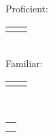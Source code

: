 {	}{ %
		
		\noindent\begin{minipage}[t]{0.275\textwidth}
			
			\sidesection{\educationhistory}	\\[0.25\baselineskip]
			\educationUW 
			\educationEvergreen
			\educationHyogo
			
			\sidesection{\courses} \\
			\sidebarcoursework
			
			
			\sidesection{\skills} \\ 
			\sidesubsection{\skillsprogramming} \\
			Proficient:\\[0.25\baselineskip]
			\begin{tabular}{l l}
				\proficientskills
			\end{tabular}\\
			Familiar: \\[0.25\baselineskip]
			\begin{tabular}{l l} 
				\familiarskills
			\end{tabular}

			
			\sidesubsection{\skillslanguage} \\
			\begin{tabular}{l}
				\skillenglish \\
				\skilljapanese
			\end{tabular} \quarterlinebreak \\
			
			
		\end{minipage}
		\hfill
		\begin{minipage}[t]{0.7\textwidth}
			\majorsection{\experience} 
				\jobexpNPD
				\jobexpGSP
				\jobexpGDIIntern	
		\majorsection{\graduatecoursework} 
		\courseworkML
		\courseworkNLM
		\courseworkNLP

		\majorsection{\projectsawards\vspace{-0.25\baselineskip}} 
		\awardAmplify 
		\awardGoldenTicket 
		\awardParasite
		
		\end{minipage}
		
	}
	
